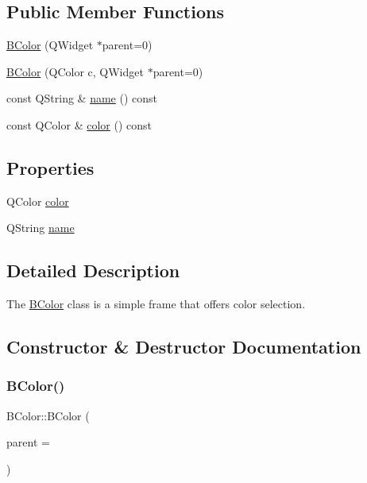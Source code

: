 \subsection*{Public Member Functions}
\begin{DoxyCompactItemize}
\item 
\hyperlink{class_b_color_ac6b258d93f6b92fab2cce51d4a6a506f}{B\+Color} (Q\+Widget $\ast$parent=0)
\item 
\hyperlink{class_b_color_ae4773993aef804d6019d8216647555db}{B\+Color} (Q\+Color c, Q\+Widget $\ast$parent=0)
\item 
const Q\+String \& \hyperlink{class_b_color_a130caf6bc837b4f53544bd5f11b34cd3}{name} () const
\item 
const Q\+Color \& \hyperlink{class_b_color_ab9a9f1cb29c1894b5dc9c563a9256c3b}{color} () const
\end{DoxyCompactItemize}
\subsection*{Properties}
\begin{DoxyCompactItemize}
\item 
Q\+Color \hyperlink{class_b_color_af5d46ba62e3868ab618269dff46d5718}{color}
\item 
Q\+String \hyperlink{class_b_color_a68e6b6c8c92fe004a98b44d48ba8a42a}{name}
\end{DoxyCompactItemize}


\subsection{Detailed Description}
The \hyperlink{class_b_color}{B\+Color} class is a simple frame that offers color selection. 

\subsection{Constructor \& Destructor Documentation}
\hypertarget{class_b_color_ac6b258d93f6b92fab2cce51d4a6a506f}{}\label{class_b_color_ac6b258d93f6b92fab2cce51d4a6a506f} 
\subsubsection{\texorpdfstring{B\+Color()}{BColor()}\hspace{0.1cm}{\footnotesize\ttfamily [1/2]}}
{\footnotesize\ttfamily B\+Color\+::\+B\+Color (\begin{DoxyParamCaption}\item[{Q\+Widget $\ast$}]{parent = {} }\end{DoxyParamCaption})\hspace{0.3cm}{\ttfamily [explicit]}}

